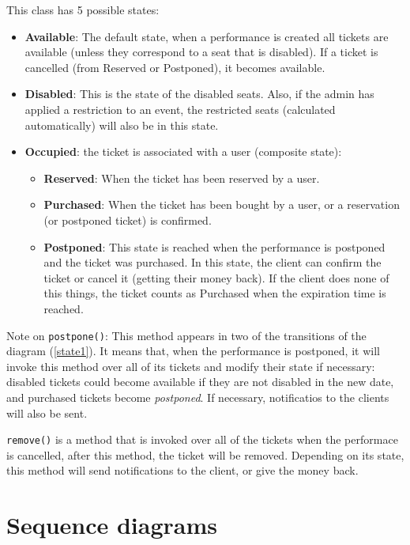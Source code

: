\documentclass{article}
\begin{document}
This class has 5 possible states:
\begin{itemize}
    \item \textbf{Available}: The default state, when a performance is created all tickets are available (unless they correspond to a seat that is disabled). If a ticket is cancelled (from Reserved or Postponed), it becomes available.
    \item \textbf{Disabled}: This is the state of the disabled seats. Also, if the admin has applied a restriction to an event, the restricted seats (calculated automatically) will also be in this state.
    \item \textbf{Occupied}: the ticket is associated with a user (composite state):
    \begin{itemize}
        \item \textbf{Reserved}: When the ticket has been reserved by a user. 
        \item \textbf{Purchased}: When the ticket has been bought by a user, or a reservation (or postponed ticket) is confirmed.
        \item \textbf{Postponed}: This state is reached when the performance is postponed and the ticket was purchased. In this state, the client can confirm the ticket or cancel it (getting their money back). If the client does none of this things, the ticket counts as Purchased when the expiration time is reached.
    \end{itemize}
\end{itemize}

Note on \texttt{postpone()}: This method appears in two of the transitions of the diagram (\ref{state1}). It means that, when the performance is postponed, it will invoke this method over all of its tickets and modify their state if necessary: disabled tickets could become available if they are not disabled in the new date, and purchased tickets become \textit{postponed}. If necessary, notificatios to the clients will also be sent.

\texttt{remove()} is a method that is invoked over all of the tickets when the performace is cancelled, after this method, the ticket will be removed. Depending on its state, this method will send notifications to the client, or give the money back.


\newpage



\section{Sequence diagrams}
\end{document}
